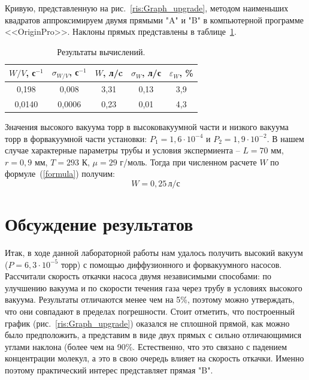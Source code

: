 \documentclass[a4paper,12pt]{article} %
\begin{document}
	Кривую, представленную на рис.~\ref{ris:Graph_upgrade}, методом наименьших квадратов аппроксимируем двумя прямыми "A" и "B" в компьютерной программе <<OriginPro>>. Наклоны прямых представлены в таблице~\ref{table:result_of_W/V}.
	
	
\begin{table}[H]
\caption{Результаты вычислений.}
\label{table:result_of_W/V}
\begin{tabular}{|c|c|c|c|c|}
\hline
$W/V$, с$^{-1}$ & $\sigma_{W/V}$, с$^{-1}$ & $W$, л/c & $\sigma_W$, л/с & $\varepsilon_W$, \% \\ \hline
0,198           & 0,008                    & 3,31     & 0,13            & 3,9                 \\ \hline
0,0140          & 0,0006                   & 0,23     & 0,01            & 4,3                 \\ \hline
\end{tabular}
\end{table}

	Значения высокого вакуума  торр в высоковакуумной части и низкого вакуума торр в форвакуумной части установки: $P_1 = 1,6 \cdot 10^{-4}$ и $P_2 = 1,9 \cdot 10^{-2}$. В нашем случае характерные параметры трубы и условия экспермиента -- $L = 70$ мм, $r = 0,9$ мм, $T = 293$ К, $\mu = 29$ г/моль. Тогда при численном расчете $W$ по формуле~(\ref{formula}) получим:
\begin{equation*}
	W = 0,25 \, \text{л/с}
\end{equation*}


\newpage
\section{Обсуждение результатов}
	Итак, в ходе данной лабораторной работы нам удалось получить высокий вакуум ($P = 6,3 \cdot 10^{-5}$ торр) с помощью диффузионного и форвакуумного насосов. Рассчитали скорость откачки насоса двумя независимыми способами: по улучшению вакуума и по скорости течения газа через трубу в условиях высокого вакуума. Результаты отличаются менее чем на 5\%, поэтому можно утверждать, что они совпадают в пределах погрешности. Стоит отметить, что построенный график (рис.~\ref{ris:Graph_upgrade}) оказался не сплошной прямой, как можно было предположить, а представим в виде двух прямых с сильно отличающимися углами наклона (более чем на 90\%. Естественно, что это связано с падением концентрации молекул, а это в свою очередь влияет на скорость откачки. Именно поэтому практический интерес представляет прямая "B".
	
\end{document}
